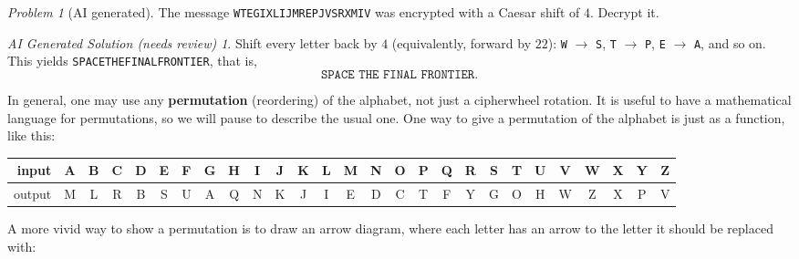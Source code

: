 \documentclass{article}
\theoremstyle{plain}
\theoremstyle{definition}
\theoremstyle{remark}
\newtheorem{problem}[theorem]{Problem}
\newtheorem*{aisolution}{AI Generated Solution (needs review)}
\numberwithin{theorem}{section}
\begin{document}
\begin{problem}[AI generated]
The message \texttt{WTEGIXLIJMREPJVSRXMIV} was encrypted with a Caesar shift of $4$.  Decrypt it.
\end{problem}
\begin{aisolution}
Shift every letter back by $4$ (equivalently, forward by $22$):  \texttt{W} $\to$ \texttt{S}, \texttt{T} $\to$ \texttt{P}, \texttt{E} $\to$ \texttt{A}, and so on.  This yields \texttt{SPACETHEFINALFRONTIER}, that is,
\[
	\texttt{SPACE THE FINAL FRONTIER}.
\]
\end{aisolution}



In general, one may use any \textbf{permutation} (reordering) of the alphabet, not just a cipherwheel rotation.  It is useful to have a mathematical language for permutations, so we will pause to describe the usual one.  One way to give a permutation of the alphabet is just as a function, like this:

\begin{center}
\small
\setlength{\tabcolsep}{2.6pt}
\begin{tabular}{r|cccccccccccccccccccccccccc}
  input & A & B & C & D & E & F & G & H & I & J & K & L & M & N & O & P & Q & R & S & T & U & V & W & X & Y & Z \\
\hline
  output & M & L & R & B & S & U & A & Q & N & K & J & I & E & D & C & T & F & Y & G & O & H & W & Z & X & P & V \\
\end{tabular}
\end{center}

A more vivid way to show a permutation is to draw an arrow diagram, where each letter has an arrow to the letter it should be replaced with:
\end{document}
